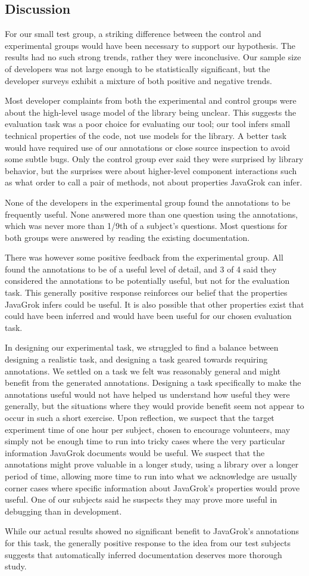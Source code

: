 \subsection{Discussion}
For our small test group, a striking difference between the control and
experimental groups would have been necessary to support our hypothesis.  The
results had no such strong
trends, rather they were inconclusive.  Our sample size of developers was not
large enough to be statistically significant, but the developer surveys exhibit
a mixture of both positive and negative trends.

Most developer complaints from both the experimental and control groups were
about the high-level usage model of the library being unclear.  This suggests
the evaluation task was
a poor choice for evaluating our tool; our tool infers small technical
properties of the code, not use models for the library.  A better task would
have required use of our annotations or close source inspection to avoid some
subtle bugs.  Only the control group ever said they were surprised by library
behavior, but the surprises were about higher-level component interactions such
as what order to call a pair of methods, not about properties JavaGrok can
infer.

None of the developers in the experimental group found the annotations to be
frequently useful.  None answered more than one question using the
annotations, which was never more than 1/9th of a subject's questions.  Most
questions for both groups were answered by reading the existing documentation.

There was however some positive feedback from the experimental group.  All
found the annotations to be of a useful level of detail, and 3 of 4 said they
considered the annotations
to be potentially useful, but not for the evaluation task.  This generally
positive response reinforces our belief that the properties
JavaGrok infers could be useful.  It is also possible that other properties
exist that could have been inferred and would have been useful for our chosen
evaluation task.

In designing
our experimental task, we struggled to find a balance between designing a
realistic task, and designing a task geared towards requiring annotations.  We
settled on a task we felt was reasonably general and might benefit from the
generated annotations.  Designing a task specifically to make the annotations useful would
not have helped us understand how useful they were generally, but the situations
where they would provide benefit seem not appear to occur in such a short exercise.
Upon reflection, we suspect that the target experiment time of one hour per
subject, chosen to encourage volunteers, may simply not be enough time to run
into tricky cases where the very particular information JavaGrok documents would
be useful.  We suspect that the annotations might prove valuable in a longer
study, using a library over a longer period of time, allowing more time to run
into what we acknowledge are usually corner cases where specific information
about JavaGrok's properties would prove useful.  One of our subjects said he
suspects they may prove more useful in debugging than in development.

While our actual results showed no significant benefit to JavaGrok's annotations
for this task, the generally positive response to the idea from our test
subjects suggests that automatically inferred documentation deserves more
thorough study.

